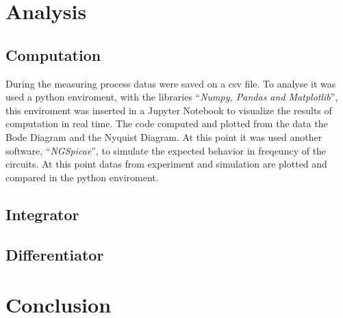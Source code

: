 \documentclass[a4paper,twocolumn]{article}
\begin{document}
\section{Analysis}

\subsection{Computation}

During the measuring process datas were saved on a csv file. To analyse  it was used a python enviroment, with the libraries ``\emph{Numpy, Pandas and Matplotlib}'', this enviroment was inserted in a Jupyter Notebook to visualize the results of computation in real time. The code computed and plotted from the data the Bode Diagram and the Nyquist Diagram. At this point it was used another software, ``\emph{NGSpicae}'', to simulate the expected behavior in freqeuncy of the circuits. At this point datas from experiment and simulation are plotted and compared in the python enviroment.

\subsection{Integrator}

\subsection{Differentiator}

\section{Conclusion}
\end{document}
